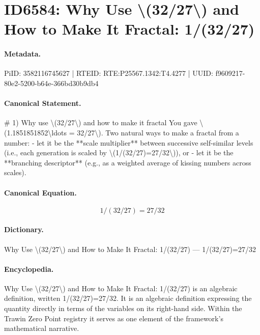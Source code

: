 \section*{ID6584: Why Use \textbackslash{}(32/27\textbackslash{}) and How to Make It Fractal: 1/(32/27)}
\paragraph{Metadata.}
PiID: 3582116745627 | RTEID: RTE:P25567.1342:T4.4277 | UUID: f9609217-80e2-5200-b64e-366bd30b9db4

\paragraph{Canonical Statement.}
\# 1) Why use \textbackslash{}(32/27\textbackslash{}) and how to make it fractal You gave \textbackslash{}(1.1851851852\textbackslash{}ldots = 32/27\textbackslash{}). Two natural ways to make a fractal from a number: - let it be the **scale multiplier** between successive self-similar levels (i.e., each generation is scaled by \textbackslash{}(1/(32/27)=27/32\textbackslash{})), or - let it be the **branching descriptor** (e.g., as a weighted average of kissing numbers across scales).

\paragraph{Canonical Equation.}
\[
1/(32/27)=27/32
\]

\paragraph{Dictionary.}
Why Use \textbackslash{}(32/27\textbackslash{}) and How to Make It Fractal: 1/(32/27) — 1/(32/27)=27/32

\paragraph{Encyclopedia.}
Why Use \textbackslash{}(32/27\textbackslash{}) and How to Make It Fractal: 1/(32/27) is an algebraic definition, written 1/(32/27)=27/32. It is an algebraic definition expressing the quantity directly in terms of the variables on its right-hand side. Within the Trawin Zero Point registry it serves as one element of the framework's mathematical narrative.
